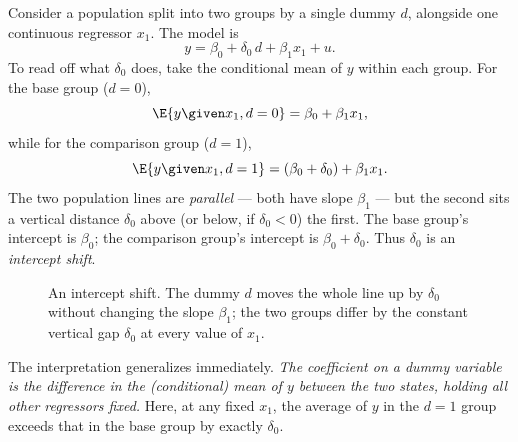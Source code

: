 
Consider a population split into two groups by a single dummy $d$, alongside one continuous regressor $x_1$. The model is
\[
y = \beta_0 + \delta_0 \, d + \beta_1 x_1 + u.
\]
To read off what $\delta_0$ does, take the conditional mean of $y$ within each group. For the base group ($d=0$),
\[
\E{y \given x_1, d=0} = \beta_0 + \beta_1 x_1,
\]
while for the comparison group ($d=1$),
\[
\E{y \given x_1, d=1} = (\beta_0 + \delta_0) + \beta_1 x_1.
\]
The two population lines are \emph{parallel} --- both have slope $\beta_1$ --- but the second sits a vertical distance $\delta_0$ above (or below, if $\delta_0<0$) the first. The base group's intercept is $\beta_0$; the comparison group's intercept is $\beta_0+\delta_0$. Thus $\delta_0$ is an \emph{intercept shift}.

\begin{figure}[h]
\centering
{}
\caption{An intercept shift. The dummy $d$ moves the whole line up by $\delta_0$ without changing the slope $\beta_1$; the two groups differ by the constant vertical gap $\delta_0$ at every value of $x_1$.}
\label{fig:intercept-shift}
\end{figure}

The interpretation generalizes immediately. \emph{The coefficient on a dummy variable is the difference in the (conditional) mean of $y$ between the two states, holding all other regressors fixed.} Here, at any fixed $x_1$, the average of $y$ in the $d=1$ group exceeds that in the base group by exactly $\delta_0$.

